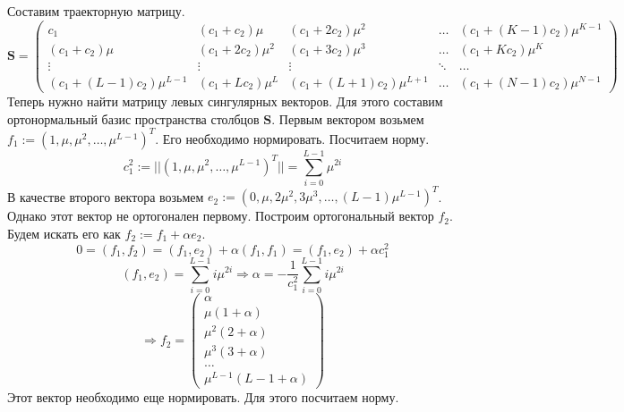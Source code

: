 \documentclass[specialist, substylefile = spbureport.rtx, subf,href,colorlinks=true, 12pt]{disser}
\theoremstyle{definition}
\begin{document}
    Составим траекторную матрицу.
    \begin{equation*}
    \mathbf{S} = 
        \begin{pmatrix}
            c_1 & (c_1 + c_2)\mu & (c_1 + 2c_2)\mu^2 & \dots & (c_1 + (K - 1)c_2)\mu^{K - 1} \\
            (c_1 + c_2)\mu & (c_1 + 2c_2)\mu^2 & (c_1 + 3c_2)\mu^3 & \dots & (c_1 + Kc_2)\mu^K \\
            \vdots & \vdots & \vdots & \ddots & \dots \\
            (c_1 + (L - 1)c_2)\mu^{L - 1} & (c_1 + Lc_2)\mu^L & (c_1 + (L + 1)c_2)\mu^{L + 1} & \dots & (c_1 + (N - 1)c_2)\mu^{N - 1}
        \end{pmatrix}
    \end{equation*}
    Теперь нужно найти матрицу левых сингулярных векторов. Для этого составим ортонормальный базис пространства столбцов $\mathbf{S}$. Первым вектором возьмем \\ $f_1 := (1, \mu, \mu^2, \dots, \mu^{L - 1})^T$. Его необходимо нормировать. Посчитаем норму. 
\begin{equation*}
    c_1^2:=||(1, \mu, \mu^2, \dots, \mu^{L - 1})^T|| = \sum_{i = 0}^{L - 1}\mu^{2i}
\end{equation*}
В качестве второго вектора возьмем $e_2:=(0, \mu, 2\mu^2, 3\mu^3, \dots, (L - 1)\mu^{L - 1})^T$. Однако этот вектор не ортогонален первому. Построим ортогональный вектор $f_2$. Будем искать его как $f_2 := f_1 + \alpha e_2$. 
\begin{equation*}
    0 = (f_1, f_2) = (f_1, e_2) + \alpha (f_1, f_1) = (f_1, e_2) + \alpha c_1^2
\end{equation*}
\begin{equation*}
    (f_1, e_2) = \sum_{i = 0}^{L - 1}i \mu^{2i} \Rightarrow \alpha = -\frac{1}{c_1^2}\sum_{i = 0}^{L - 1}i\mu^{2i}
\end{equation*}
\begin{equation*}
    \Rightarrow f_2 = \begin{pmatrix}
        \alpha \\
        \mu (1 + \alpha) \\
        \mu^2(2 + \alpha) \\
        \mu^3(3 + \alpha) \\
        \dots \\
        \mu^{L - 1}(L - 1 + \alpha)
    \end{pmatrix}
\end{equation*}
Этот вектор необходимо еще нормировать. Для этого посчитаем норму. 
\end{document}
